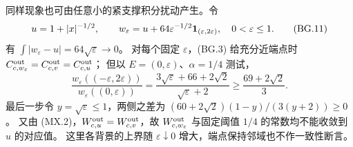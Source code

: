 同样现象也可由任意小的紧支撑积分扰动产生。令
\[u=1+|x|^{-1/2},\qquad
w_\varepsilon=u+64\varepsilon^{-1/2}\mathbf 1_{(\varepsilon,2\varepsilon)},
\quad0<\varepsilon\le1.\tag{BG.11}\]
有 $\int|w_\varepsilon-u|=64\sqrt\varepsilon\to0$。
对每个固定 $\varepsilon$，(BG.3) 给充分近端点时
$C^{\rm out}_{c,w_\varepsilon}=C^{\rm out}_{c,v}=C^{\rm out}_{c,u}$；
但以 $E=(0,\varepsilon)$、$\alpha=1/4$ 测试，
\[\frac{w_\varepsilon((-\varepsilon,2\varepsilon))}{w_\varepsilon((0,\varepsilon))}
=\frac{3\sqrt\varepsilon+66+2\sqrt2}{\sqrt\varepsilon+2}
\ge\frac{69+2\sqrt2}{3}.\tag{BG.12}\]
最后一步令 $y=\sqrt\varepsilon\le1$，两侧之差为 $(60+2\sqrt2)(1-y)/(3(y+2))\ge0$。
又由 (MX.2)，$W^{\rm out}_{c,u}=W^{\rm out}_{c,v}$，故 $W^{\rm out}_{c,w_\varepsilon}$ 与固定阈值 $1/4$ 的常数均不能收敛到 $u$ 的对应值。
这里各背景的上界随 $\varepsilon\downarrow0$ 增大，端点保持邻域也不作一致性断言。
